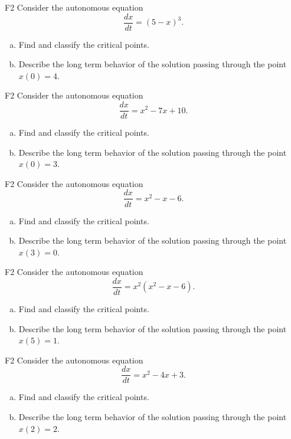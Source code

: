 \begin{problem}{F2}
Consider the autonomous equation
\[
\frac{dx}{dt} = (5 - x)^3.
\]
\begin{enumerate}[(a)]
\item Find and classify the critical points.
\item Describe the long term behavior of the solution passing through the point \(x(0)=4\).
\end{enumerate}
\end{problem}

\begin{problem}{F2}
Consider the autonomous equation
\[
\frac{dx}{dt} = x^2 - 7x + 10.
\]
\begin{enumerate}[(a)]
\item Find and classify the critical points.
\item Describe the long term behavior of the solution passing through the point \(x(0)=3\).
\end{enumerate}
\end{problem}

\begin{problem}{F2}
Consider the autonomous equation
\[
\frac{dx}{dt} = x^2 - x - 6.
\]
\begin{enumerate}[(a)]
\item Find and classify the critical points.
\item Describe the long term behavior of the solution passing through the point \(x(3)=0\).
\end{enumerate}
\end{problem}

\begin{problem}{F2}
Consider the autonomous equation
\[
\frac{dx}{dt} = x^2(x^2 - x - 6).
\]
\begin{enumerate}[(a)]
\item Find and classify the critical points.
\item Describe the long term behavior of the solution passing through the point \(x(5)=1\).
\end{enumerate}
\end{problem}

\begin{problem}{F2}
Consider the autonomous equation
\[
\frac{dx}{dt} = x^2 - 4x + 3.
\]
\begin{enumerate}[(a)]
\item Find and classify the critical points.
\item Describe the long term behavior of the solution passing through the point \(x(2)=2\).
\end{enumerate}
\end{problem}

